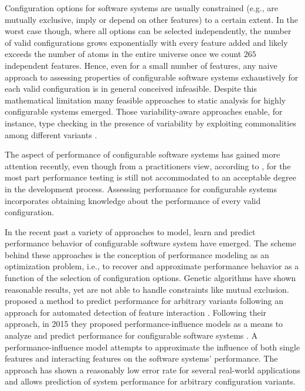 Configuration options for software systems are usually constrained (e.g., are
mutually exclusive, imply or depend on other features) to a certain extent. In
the worst case though, where all options can be selected independently, the
number of valid configurations grows exponentially with every feature added and
likely exceeds the number of atoms in the entire universe once we count $265$
independent features. Hence, even for a small number of features, any naive
approach to assessing properties of configurable software systems exhaustively
for each valid configuration is in general conceived infeasible. Despite this
mathematical limitation many feasible approaches to static analysis for highly
configurable systems emerged. Those variability-aware approaches enable, for
instance, type checking in the presence of variability by
exploiting commonalities among different variants \citep{thum_classification_2014}.

The aspect of performance of configurable software systems has gained more
attention recently, even though from a practitioners view, according to
\cite{molyneaux_art_2014}, for the most part performance testing is still not
accommodated to an acceptable degree in the development process.
Assessing performance for configurable systems incorporates obtaining knowledge about the performance of
every valid configuration. 

In the recent past a variety of approaches to
model, learn and predict performance behavior of configurable software system
have emerged. The scheme behind these approaches is the conception of
performance modeling as an optimization problem, i.e., to recover and
approximate performance behavior as a function of the selection of
configuration options.
Genetic algorithms \citep{guo_genetic_2011,sayyad_scalable_2013}  have shown reasonable results, yet are not able to handle constraints like mutual
exclusion. \cite{siegmund_predicting_2012} proposed a
method to predict performance for arbitrary variants following an approach for
automated detection of feature interaction \citep{siegmund_predicting_2012}.
Following their approach, in 2015 they proposed performance-influence models as a means
to analyze and predict performance for configurable software systems
\citep{siegmund_performance-influence_2015}. A performance-influence model
attempts to approximate the influence of both single features and interacting
features on the software systems' performance.
The approach has shown a reasonably low error rate for several real-world
applications and allows prediction of system performance for arbitrary
configuration variants.


